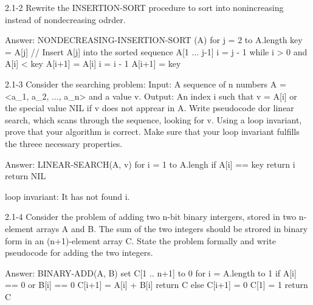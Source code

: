 2.1-2
Rewrite the INSERTION-SORT procedure to sort into nonincreasing instead of nondecreasing odrder.

Answer:
NONDECREASING-INSERTION-SORT (A)
  for j = 2 to A.length
    key = A[j]
    // Insert A[j] into the sorted sequence A[1 ... j-1]
    i = j - 1
    while i > 0 and A[i] < key
      A[i+1] = A[i]
      i = i - 1
    A[i+1] = key
    
2.1-3
Consider the searching problem:
  Input: A sequence of n numbers A = <a_1, a_2, ..., a_n> and a value v.
  Output: An index i such that v = A[i] or the special value NIL if v does not apprear in A.
Write pseudocode dor linear search, which scans through the sequence, looking for v. Using a loop invariant, prove that your algorithm is correct. Make sure that your loop invariant fulfills the threee necessary properties.

Answer:
LINEAR-SEARCH(A, v)
  for i = 1 to A.lengh
    if A[i] == key
      return i
  return NIL
  
loop invariant: It has not found i.
  
2.1-4
Consider the problem of adding two n-bit binary intergers, stored in two n-element arrays A and B. The sum of the two integers should be strored in binary form in an (n+1)-element array C. State the problem formally and write pseudocode for adding the two integers.

Answer:
BINARY-ADD(A, B)
  set C[1 .. n+1] to 0
  for i = A.length to 1
    if A[i] == 0 or B[i] == 0
      C[i+1] = A[i] + B[i]
      return C
    else
      C[i+1] = 0
  C[1] = 1
  return C  
